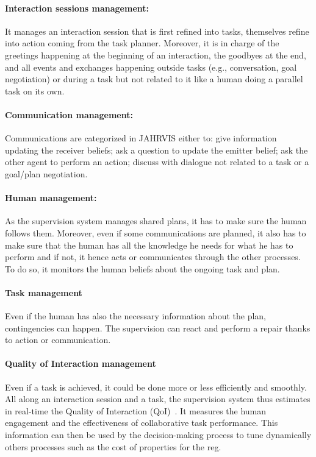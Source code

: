 \paragraph{Interaction sessions management:} It manages an interaction session that is first refined into tasks, themselves refine into action coming from the task planner. Moreover, it is in charge of the greetings happening at the beginning of an interaction, the goodbyes at the end, and all events and exchanges happening outside tasks (e.g., conversation, goal negotiation) or during a task but not related to it like a human doing a parallel task on its own.

\paragraph{Communication management:} Communications are categorized in JAHRVIS either to: give information updating the receiver beliefs; ask a question to update the emitter belief; ask the other agent to perform an action; discuss with dialogue not related to a task or a goal/plan negotiation. 

\paragraph{Human management:} As the supervision system manages shared plans, it has to make sure the human follows them. Moreover, even if some communications are planned, it also has to make sure that the human has all the knowledge he needs for what he has to perform and if not, it hence acts or communicates through the other processes. To do so, it monitors the human beliefs about the ongoing task and plan.

\paragraph{Task management} Even if the human has also the necessary information about the plan, contingencies can happen. The supervision can react and perform a repair thanks to action or communication.

\paragraph{Quality of Interaction management} Even if a task is achieved, it could be done more or less efficiently and smoothly. All along an interaction session and a task, the supervision system thus estimates in real-time the Quality of Interaction (QoI)~\cite{mayima_2020_toward}. It measures the human engagement and the effectiveness of collaborative task performance. This information can then be used by the decision-making process to tune dynamically others processes such as the cost of properties for the \acrshort{reg}.

